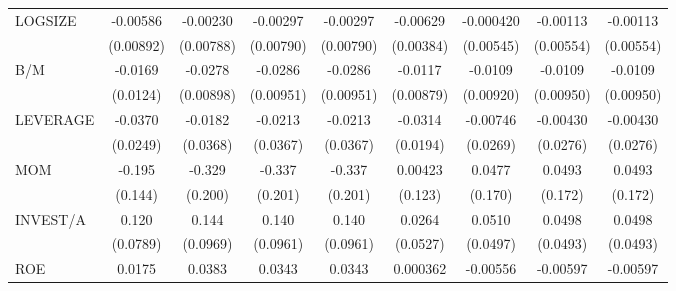 \begin{table}[htbp]
\begin{tabular}{l*{8}{c}}
LOGSIZE             &    -0.00586         &    -0.00230         &    -0.00297         &    -0.00297         &    -0.00629         &   -0.000420         &    -0.00113         &    -0.00113         \\
                    &   (0.00892)         &   (0.00788)         &   (0.00790)         &   (0.00790)         &   (0.00384)         &   (0.00545)         &   (0.00554)         &   (0.00554)         \\
B/M                 &     -0.0169         &     -0.0278\sym{***}&     -0.0286\sym{***}&     -0.0286\sym{***}&     -0.0117         &     -0.0109         &     -0.0109         &     -0.0109         \\
                    &    (0.0124)         &   (0.00898)         &   (0.00951)         &   (0.00951)         &   (0.00879)         &   (0.00920)         &   (0.00950)         &   (0.00950)         \\
LEVERAGE            &     -0.0370         &     -0.0182         &     -0.0213         &     -0.0213         &     -0.0314         &    -0.00746         &    -0.00430         &    -0.00430         \\
                    &    (0.0249)         &    (0.0368)         &    (0.0367)         &    (0.0367)         &    (0.0194)         &    (0.0269)         &    (0.0276)         &    (0.0276)         \\
MOM                 &      -0.195         &      -0.329         &      -0.337         &      -0.337         &     0.00423         &      0.0477         &      0.0493         &      0.0493         \\
                    &     (0.144)         &     (0.200)         &     (0.201)         &     (0.201)         &     (0.123)         &     (0.170)         &     (0.172)         &     (0.172)         \\
INVEST/A            &       0.120         &       0.144         &       0.140         &       0.140         &      0.0264         &      0.0510         &      0.0498         &      0.0498         \\
                    &    (0.0789)         &    (0.0969)         &    (0.0961)         &    (0.0961)         &    (0.0527)         &    (0.0497)         &    (0.0493)         &    (0.0493)         \\
ROE                 &      0.0175         &      0.0383         &      0.0343         &      0.0343         &    0.000362         &    -0.00556         &    -0.00597         &    -0.00597         \\

\end{tabular}
\end{table}
